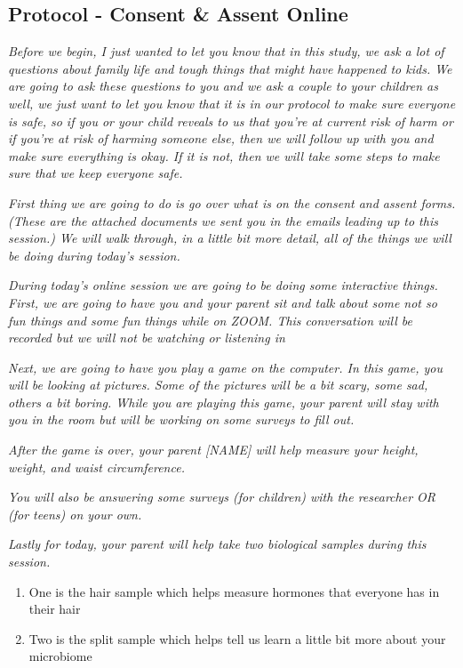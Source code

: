 \documentclass[]{book}
\begin{document}
\hypertarget{protocol---consent-assent-online-2}{%
\subsection{Protocol - Consent \& Assent Online}\label{protocol---consent-assent-online-2}}

\emph{Before we begin, I just wanted to let you know that in this study, we ask a lot of questions about family life and tough things that might have happened to kids. We are going to ask these questions to you and we ask a couple to your children as well, we just want to let you know that it is in our protocol to make sure everyone is safe, so if you or your child reveals to us that you're at current risk of harm or if you're at risk of harming someone else, then we will follow up with you and make sure everything is okay. If it is not, then we will take some steps to make sure that we keep everyone safe.}

\emph{First thing we are going to do is go over what is on the consent and assent forms. (These are the attached documents we sent you in the emails leading up to this session.) We will walk through, in a little bit more detail, all of the things we will be doing during today's session.}

\emph{During today's online session we are going to be doing some interactive things. First, we are going to have you and your parent sit and talk about some not so fun things and some fun things while on ZOOM. This conversation will be recorded but we will not be watching or listening in}

\emph{Next, we are going to have you play a game on the computer. In this game, you will be looking at pictures. Some of the pictures will be a bit scary, some sad, others a bit boring. While you are playing this game, your parent will stay with you in the room but will be working on some surveys to fill out.}

\emph{After the game is over, your parent {[}NAME{]} will help measure your height, weight, and waist circumference.}

\emph{You will also be answering some surveys (for children) with the researcher OR (for teens) on your own.}

\emph{Lastly for today, your parent will help take two biological samples during this session.}

\begin{enumerate}
\def\labelenumi{\arabic{enumi}.}
\item
  One is the hair sample which helps measure hormones that everyone has in their hair
\item
  Two is the split sample which helps tell us learn a little bit more about your microbiome
\end{enumerate}
\end{document}
